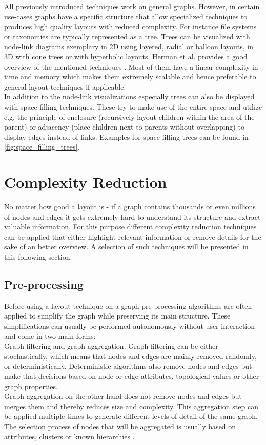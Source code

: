 All previously introduced techniques work on general graphs. However, in certain use-cases graphs have a specific structure that allow specialized techniques to produces high quality layouts with reduced complexity. For instance file systems or taxonomies are typically represented as a tree. Trees can be visualized with node-link diagrams exemplary in 2D using layered, radial or balloon layouts, in 3D with cone trees or with hyperbolic layouts. Herman et al. provides a good overview of the mentioned techniques \cite{Herman2000}. Most of them have a linear complexity in time and memory which makes them extremely scalable and hence preferable to general layout techniques if applicable. \\
In addition to the node-link visualizations especially trees can also be displayed with space-filling techniques. These try to make use of the entire space and utilize e.g. the principle of enclosure (recursively layout children within the area of the parent) or adjacency (place children next to parents without overlapping) to display edges instead of links\cite{VonLandesberger2011}. Examples for space filling trees can be found in \autoref{fig:space_filling_trees}.\\



\section{Complexity Reduction}
No matter how good a layout is - if a graph contains thousands or even millions of nodes and edges it gets extremely hard to understand its structure and extract valuable information. For this purpose different complexity reduction techniques can be applied that either highlight relevant information or remove details for the sake of an better overview. A selection of such techniques will be presented in this following section.

\subsection{Pre-processing}
Before using a layout technique on a graph pre-processing algorithms are often applied to simplify the graph while preserving its main structure. These simplifications can usually be performed autonomously without user interaction and come in two main forms:\\
Graph filtering and graph aggregation. Graph filtering can be either stochastically, which means that nodes and edges are mainly removed randomly, or deterministically. Deterministic algorithms also remove nodes and edges but make that decisions based on node or edge attributes, topological values or other graph properties.\\
Graph aggregation on the other hand does not remove nodes and edges but merges them and thereby reduces size and complexity. This aggregation step can be applied multiple times to generate different levels of detail of the same graph. The selection process of nodes that will be aggregated is usually based on attributes, clusters or known hierarchies \cite{VonLandesberger2011}.

